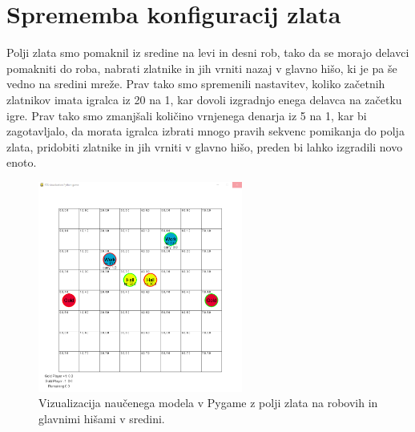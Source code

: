 \documentclass[a4paper, 12pt]{book}
\begin{document}
\section{Sprememba konfiguracij zlata}
\label{resultThird}

Polji zlata smo pomaknil iz sredine na levi in desni rob, tako da se morajo delavci pomakniti do roba, nabrati zlatnike in jih vrniti nazaj v glavno hišo, ki je pa še vedno na sredini mreže.
Prav tako smo spremenili nastavitev, koliko začetnih zlatnikov imata igralca iz 20 na 1, kar dovoli izgradnjo enega delavca na začetku igre.
Prav tako smo zmanjšali količino vrnjenega denarja iz 5 na 1, kar bi zagotavljalo, da morata igralca izbrati mnogo pravih sekvenc pomikanja do polja zlata, pridobiti zlatnike in jih vrniti v glavno hišo, preden bi lahko izgradili novo enoto.

\begin{figure}[h]
	\begin{center}
		\includegraphics[width=0.6\textwidth]{photos/third-2018-11-14.pdf}
	\end{center}
	\caption{Vizualizacija naučenega modela v Pygame z polji zlata na robovih in glavnimi hišami v sredini.}
	\label{vizualizacijaRezultatovSpremembaZlata}
\end{figure}
\end{document}
